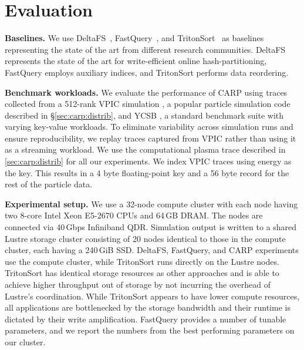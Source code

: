 
\section{Evaluation}
\label{sec:carp:eval}

\noindent
\textbf{Baselines.
}
We use DeltaFS~\cite{Zheng2018:DeltaFS}, FastQuery~\cite{Chou2011:FastQuery}, and
TritonSort~\cite{Rasmu2011:TritonSort} as baselines representing the state of the art from
different research communities.
DeltaFS represents the state of the art for write-efficient online hash-partitioning, FastQuery
employs auxiliary indices, and TritonSort performs data reordering.
\vspace{5pt}

\noindent
\textbf{Benchmark workloads.
}
We evaluate the performance of CARP using traces collected from a 512-rank VPIC simulation
\cite{Byna2012}, a popular particle simulation code described in \S\ref{sec:carp:distrib}, and YCSB
\cite{Coope2010:BenchmarkingCloudServing}, a standard benchmark suite with varying key-value
workloads.
To eliminate variability across simulation runs and ensure reproducibility, we replay traces
captured from VPIC rather than using it as a streaming workload.
We use the computational plasma trace described in \autoref{sec:carp:distrib} for all our
experiments.
We index VPIC traces using energy as the key.
This results in a 4 byte floating-point key and a 56 byte record for the rest of the particle data.
\vspace{5pt}

\noindent
\textbf{Experimental setup.
}
We use a 32-node compute cluster with each node having two 8-core Intel Xeon E5-2670 CPUs and 64\,GB
DRAM.
The nodes are connected via 40\,Gbps Infiniband QDR.
Simulation output is written to a shared Lustre storage cluster consisting of 20 nodes identical to
those in the compute cluster, each having a 240\,GiB SSD.
DeltaFS, FastQuery, and CARP experiments use the compute cluster, while TritonSort runs directly on
the Lustre nodes.
TritonSort has identical storage resources as other approaches and is able to achieve higher
throughput out of storage by not incurring the overhead of Lustre's coordination.
While TritonSort appears to have lower compute resources, all applications are bottlenecked by the
storage bandwidth and their runtime is dictated by their write amplification.
FastQuery provides a number of tunable parameters, and we report the numbers from the best
performing parameters on our cluster.
\vspace{5pt}

